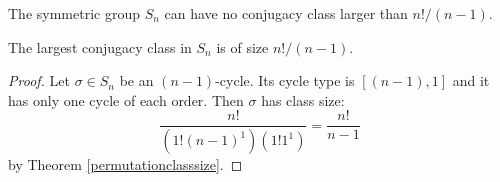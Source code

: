 \documentclass[main.tex]{subfiles}
\begin{document}
\begin{corollary}
The symmetric group $S_n$ can have no conjugacy class larger than $n!/(n-1)$.
\end{corollary}

\begin{theorem}
The largest conjugacy class in $S_n$ is of size $n!/(n-1)$.
\end{theorem}

\begin{proof}
Let $\sigma \in S_n$ be an $(n-1)$-cycle. Its cycle type is $[(n-1), 1]$ and it has only one cycle of each order. Then $\sigma$ has class size:
$$\frac{n!}{(1!(n-1)^1)(1!1^1)} = \frac{n!}{n-1}$$
by Theorem \ref{permutationclasssize}.
\end{proof}
\end{document}

